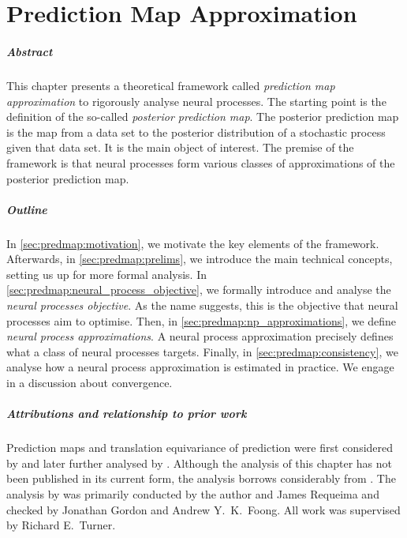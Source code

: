 \documentclass[12pt, twoside]{report}
\begin{document}
\chapter{Prediction Map Approximation}
\label{chap:predmap}

\paragraph{Abstract}
This chapter presents a theoretical framework called \emph{prediction map approximation} to
rigorously analyse neural processes.
The starting point is the definition of the so-called \emph{posterior prediction map}.
The posterior prediction map is the map from a data set to the posterior distribution of a stochastic process given that data set.
It is the main object of interest.
The premise of the framework is that neural processes form various classes of approximations of the posterior prediction map.

\paragraph{Outline}
In \cref{sec:predmap:motivation}, we motivate the key elements of the framework.
Afterwards, in \cref{sec:predmap:prelims}, we introduce the main technical concepts, setting us up for more formal analysis.
In \cref{sec:predmap:neural_process_objective}, we formally introduce and analyse the \emph{neural processes objective}.
As the name suggests, this is the objective that neural processes aim to optimise.
Then, in \cref{sec:predmap:np_approximations}, we define \emph{neural process approximations}.
A neural process approximation precisely defines what a class of neural processes targets.
Finally, in \cref{sec:predmap:consistency}, we analyse how a neural process approximation is estimated in practice.
We engage in a discussion about convergence. %


\paragraph{Attributions and relationship to prior work}
Prediction maps and translation equivariance of prediction were first considered by  and later further analysed by .
Although the analysis of this chapter has not been published in its current form,
the analysis borrows considerably from \textcite{Bruinsma:2021:The_Gaussian_Neural_Process}.
The analysis by \textcite{Bruinsma:2021:The_Gaussian_Neural_Process} was primarily
conducted by the author and James Requeima and checked by Jonathan Gordon and Andrew Y.\ K.\ Foong.
All work was supervised by Richard E.\ Turner.
\end{document}
